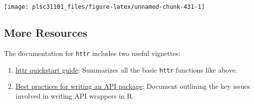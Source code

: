 \documentclass[]{book}
\newenvironment{Shaded}{\begin{snugshade}}{\end{snugshade}}
\newcommand{\KeywordTok}[1]{\textcolor[rgb]{0.13,0.29,0.53}{\textbf{#1}}}
\newcommand{\DataTypeTok}[1]{\textcolor[rgb]{0.13,0.29,0.53}{#1}}
\newcommand{\DecValTok}[1]{\textcolor[rgb]{0.00,0.00,0.81}{#1}}
\newcommand{\StringTok}[1]{\textcolor[rgb]{0.31,0.60,0.02}{#1}}
\newcommand{\CommentTok}[1]{\textcolor[rgb]{0.56,0.35,0.01}{\textit{#1}}}
\newcommand{\OperatorTok}[1]{\textcolor[rgb]{0.81,0.36,0.00}{\textbf{#1}}}
\newcommand{\NormalTok}[1]{#1}
\providecommand{\tightlist}{%
  \setlength{\itemsep}{0pt}\setlength{\parskip}{0pt}}
\begin{document}
\begin{Shaded}
\end{Shaded}

\begin{center}\texttt{[image: plsc31101\_files/figure-latex/unnamed-chunk-431-1]} \end{center}

\subsection{More Resources}\label{more-resources}

The documentation for \texttt{httr} includes two useful vignettes:

\begin{enumerate}
\def\labelenumi{\arabic{enumi}.}
\tightlist
\item
  \href{https://cran.r-project.org/web/packages/httr/vignettes/quickstart.html}{httr
  quickstart guide}: Summarizes all the basic \texttt{httr} functions
  like above.
\item
  \href{https://cran.r-project.org/web/packages/httr/vignettes/api-packages.html}{Best
  practices for writing an API package}: Document outlining the key
  issues involved in writing API wrappers in R.
\end{enumerate}
\end{document}

